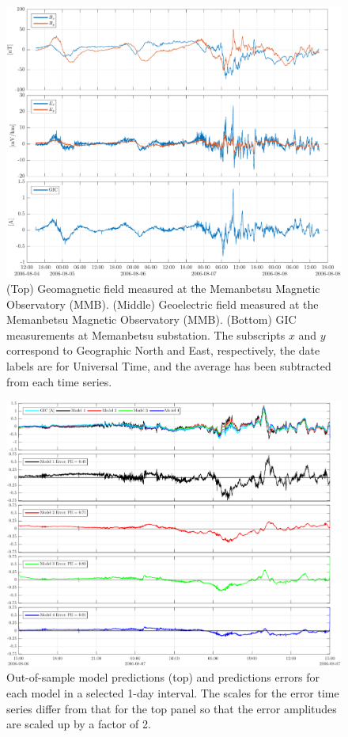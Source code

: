 \documentclass[draft,linenumbers]{agujournal2018}
\begin{document}
\begin{figure}[h]
  \centering
  \includegraphics[width=\textwidth]{figures/plot_raw_All_20060805-v1.pdf}
  \caption{(Top) Geomagnetic field measured at the Memanbetsu Magnetic Observatory (MMB). (Middle) Geoelectric field measured at the Memanbetsu Magnetic Observatory (MMB). (Bottom) GIC measurements at Memanbetsu substation. The subscripts $x$ and $y$ correspond to Geographic North and East, respectively, the date labels are for Universal Time, and the average has been subtracted from each time series.}
  \label{sample}
\end{figure}

\begin{figure}[h]
  \centering
  \includegraphics[width=\textwidth]{figures/plot_GIC_predictions-MeanModel-2006-08-06-v0-o0.pdf}
  \caption{Out-of-sample model predictions (top) and predictions errors for each model in a selected 1-day interval. The scales for the error time series differ from that for the top panel so that the error amplitudes are scaled up by a factor of 2.}
  \label{predictions}
\end{figure}
\end{document}
